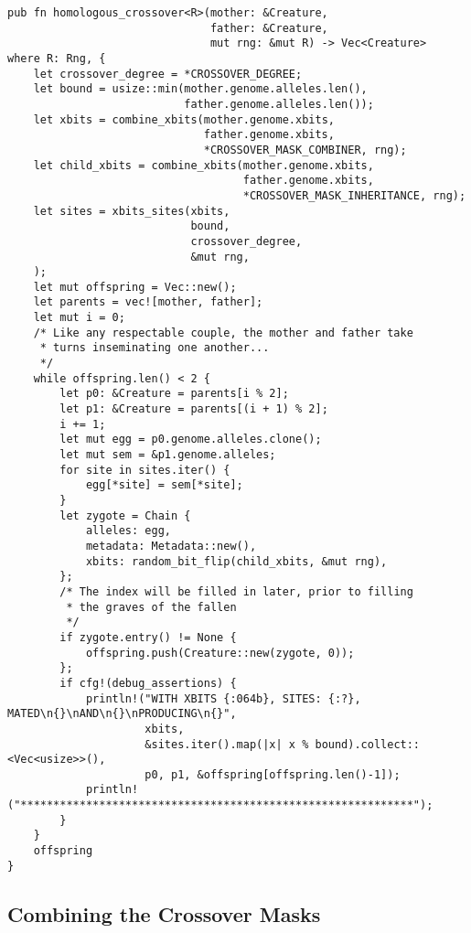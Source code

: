 \documentclass[11pt]{article}
\begin{document}
\lstset{language=rust,label=orga0b9dfc,caption= ,captionpos=b,numbers=none}
\begin{lstlisting}
pub fn homologous_crossover<R>(mother: &Creature,
                               father: &Creature,
                               mut rng: &mut R) -> Vec<Creature>
where R: Rng, {
    let crossover_degree = *CROSSOVER_DEGREE;
    let bound = usize::min(mother.genome.alleles.len(), 
                           father.genome.alleles.len());
    let xbits = combine_xbits(mother.genome.xbits, 
                              father.genome.xbits, 
                              *CROSSOVER_MASK_COMBINER, rng);
    let child_xbits = combine_xbits(mother.genome.xbits, 
                                    father.genome.xbits, 
                                    *CROSSOVER_MASK_INHERITANCE, rng);
    let sites = xbits_sites(xbits,
                            bound, 
                            crossover_degree, 
                            &mut rng,
    );
    let mut offspring = Vec::new();
    let parents = vec![mother, father];
    let mut i = 0;
    /* Like any respectable couple, the mother and father take
     * turns inseminating one another...
     */
    while offspring.len() < 2 {
        let p0: &Creature = parents[i % 2];
        let p1: &Creature = parents[(i + 1) % 2];
        i += 1;
        let mut egg = p0.genome.alleles.clone();
        let mut sem = &p1.genome.alleles;
        for site in sites.iter() {
            egg[*site] = sem[*site];
        }
        let zygote = Chain {
            alleles: egg,
            metadata: Metadata::new(),
            xbits: random_bit_flip(child_xbits, &mut rng),
        };
        /* The index will be filled in later, prior to filling
         * the graves of the fallen
         */
        if zygote.entry() != None {
            offspring.push(Creature::new(zygote, 0));
        };
        if cfg!(debug_assertions) {
            println!("WITH XBITS {:064b}, SITES: {:?}, MATED\n{}\nAND\n{}\nPRODUCING\n{}",
                     xbits,
                     &sites.iter().map(|x| x % bound).collect::<Vec<usize>>(),
                     p0, p1, &offspring[offspring.len()-1]);
            println!("************************************************************");
        }
    }
    offspring
}
\end{lstlisting}

\subsection{Combining the Crossover Masks}
\label{sec:org44f3265}
\label{org237e113}
\end{document}

